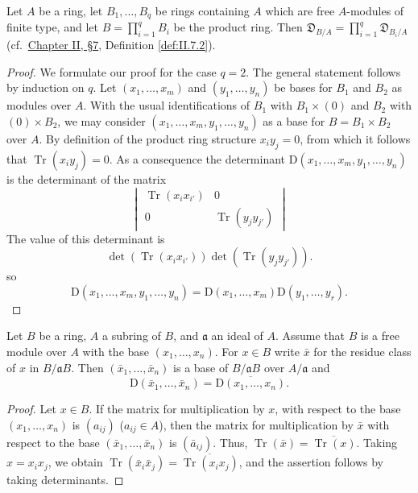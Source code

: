\begin{lemma}
\label{lem:V.3.1}
Let $A$ be a ring, let $B_{1},\ldots,B_{q}$ be rings containing $A$ which
are free $A$-modules of finite type, and let
$B=\prod_{i=1}^{q}B_{i}$ be the product ring. Then
$\mathfrak{D}_{B/A}=\prod_{i=1}^{q}\mathfrak{D}_{B_{i}/A}$ (cf.\ \hyperref[sec:2.7]{Chapter II,
§7}, Definition \ref{def:II.7.2}).
\end{lemma}

\begin{proof}
We formulate our proof for the case $q=2$. The general statement follows by
induction on $q$. Let $(x_{1},\ldots,x_{m})$ and $(y_{1},\ldots,y_{n})$ be
bases for $B_{1}$ and $B_{2}$ as modules over $A$. With the usual
identifications of $B_{1}$ with $B_{1}\times(0)$ and $B_{2}$ with
$(0)\times B_{2}$, we may consider $(x_{1},\ldots,x_{m},y_{1},\ldots,y_{n})$
as a base for $B=B_{1}\times B_{2}$ over $A$. By definition of the product
ring structure $x_{i}y_{j}=0$, from which it follows that
$\operatorname{Tr}(x_{i}y_{j})=0$. As a consequence the determinant
$\mathrm{D}(x_{1},\ldots,x_{m},y_{1},\ldots,y_{n})$ is the determinant of
the matrix
\[
\begin{vmatrix}
\operatorname{Tr}(x_{i}x_{i'}) & 0\\[2pt]
0 & \operatorname{Tr}(y_{j}y_{j'})
\end{vmatrix}
\]
The value of this determinant is
\[
\det(\operatorname{Tr}(x_{i}x_{i'}))
\det(\operatorname{Tr}(y_{j}y_{j'})).
\]
so
\[
\mathrm{D}(x_{1},\ldots,x_{m},y_{1},\ldots,y_{n})
=\mathrm{D}(x_{1},\ldots,x_{m})\mathrm{D}(y_{1},\ldots,y_{r}).
\]
\end{proof}

\begin{lemma}
\label{lem:V.3.2}
Let $B$ be a ring, $A$ a subring of $B$, and $\mathfrak{a}$ an ideal of $A$.
Assume that $B$ is a free module over $A$ with the base
$(x_{1},\ldots,x_{n})$. For $x\in B$ write $\bar x$ for the residue class of
$x$ in $B/\mathfrak{a}B$. Then $(\bar x_{1},\ldots,\bar x_{n})$ is a base of
$B/\mathfrak{a}B$ over $A/\mathfrak{a}$ and
\[
\mathrm{D}(\bar x_{1},\ldots,\bar x_{n})
=\overline{\mathrm{D}(x_{1},\ldots,x_{n})}.
\]
\end{lemma}

\begin{proof}
Let $x\in B$. If the matrix for multiplication by $x$, with respect to the
base $(x_{1},\ldots,x_{n})$ is $(a_{ij})$ ($a_{ij}\in A$), then the matrix
for multiplication by $\bar x$ with respect to the base
$(\bar x_{1},\ldots,\bar x_{n})$ is $(\bar a_{ij})$. Thus,
$\operatorname{Tr}(\bar x)=\overline{\operatorname{Tr}(x)}$. Taking
$x=x_{i}x_{j}$, we obtain
$\operatorname{Tr}(\bar x_{i}\bar x_{j})
=\overline{\operatorname{Tr}(x_{i}x_{j})}$, and the assertion follows by taking determinants.
\end{proof}


